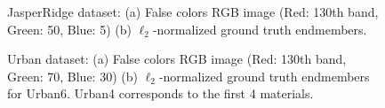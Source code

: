   \begin{figure}[h]
    \centering
    \hfil
    \caption{JasperRidge dataset: (a) False colors RGB image (Red: 130th band, Green: 50, Blue:
    5) (b) $\ell_2$-normalized ground truth endmembers.}
    \label{fig:jasper}
  \end{figure}

  \begin{figure}[h]
    \centering
    \hfil
    \caption{Urban dataset: (a) False colors RGB image (Red: 130th band, Green: 70, Blue: 30) (b)
    $\ell_2$-normalized ground truth endmembers for Urban6. Urban4 corresponds to the first 4
    materials.}
    \label{fig:urban_GT}
  \end{figure}
  

